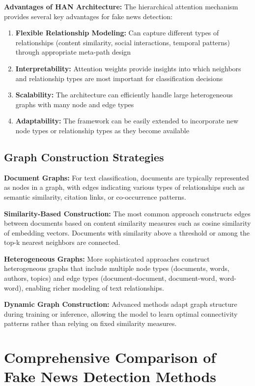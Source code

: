 \textbf{Advantages of HAN Architecture:} The hierarchical attention mechanism provides several key advantages for fake news detection:
\begin{enumerate}
\item \textbf{Flexible Relationship Modeling:} Can capture different types of relationships (content similarity, social interactions, temporal patterns) through appropriate meta-path design
\item \textbf{Interpretability:} Attention weights provide insights into which neighbors and relationship types are most important for classification decisions  
\item \textbf{Scalability:} The architecture can efficiently handle large heterogeneous graphs with many node and edge types
\item \textbf{Adaptability:} The framework can be easily extended to incorporate new node types or relationship types as they become available
\end{enumerate}

\subsection{Graph Construction Strategies}

\textbf{Document Graphs:} For text classification, documents are typically represented as nodes in a graph, with edges indicating various types of relationships such as semantic similarity, citation links, or co-occurrence patterns.

\textbf{Similarity-Based Construction:} The most common approach constructs edges between documents based on content similarity measures such as cosine similarity of embedding vectors. Documents with similarity above a threshold or among the top-k nearest neighbors are connected.

\textbf{Heterogeneous Graphs:} More sophisticated approaches construct heterogeneous graphs that include multiple node types (documents, words, authors, topics) and edge types (document-document, document-word, word-word), enabling richer modeling of text relationships.

\textbf{Dynamic Graph Construction:} Advanced methods adapt graph structure during training or inference, allowing the model to learn optimal connectivity patterns rather than relying on fixed similarity measures.

\section{Comprehensive Comparison of Fake News Detection Methods}

